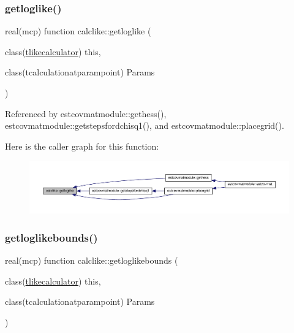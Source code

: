 \mbox{\label{namespacecalclike_a1a9de6819dc2b41653d5bf9a36bd66a1}} 
\subsubsection{\texorpdfstring{getloglike()}{getloglike()}}
{\footnotesize\ttfamily real(mcp) function calclike\+::getloglike (\begin{DoxyParamCaption}\item[{class(\mbox{\hyperlink{structcalclike_1_1tlikecalculator}{tlikecalculator}})}]{this,  }\item[{class(tcalculationatparampoint)}]{Params }\end{DoxyParamCaption})\hspace{0.3cm}{\ttfamily [private]}}



Referenced by estcovmatmodule\+::gethess(), estcovmatmodule\+::getstepsfordchisq1(), and estcovmatmodule\+::placegrid().

Here is the caller graph for this function\+:
\nopagebreak
\begin{figure}[H]
\begin{center}
\leavevmode
\includegraphics[width=350pt]{namespacecalclike_a1a9de6819dc2b41653d5bf9a36bd66a1_icgraph}
\end{center}
\end{figure}
\mbox{\label{namespacecalclike_ae4302a1d96dcdf7816b3d66125504644}} 
\subsubsection{\texorpdfstring{getloglikebounds()}{getloglikebounds()}}
{\footnotesize\ttfamily real(mcp) function calclike\+::getloglikebounds (\begin{DoxyParamCaption}\item[{class(\mbox{\hyperlink{structcalclike_1_1tlikecalculator}{tlikecalculator}})}]{this,  }\item[{class(tcalculationatparampoint)}]{Params }\end{DoxyParamCaption})\hspace{0.3cm}{\ttfamily [private]}}



